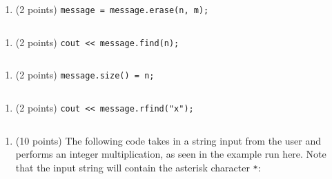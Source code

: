 \documentclass[
]{article}
\providecommand{\tightlist}{%
  \setlength{\itemsep}{0pt}\setlength{\parskip}{0pt}}
\begin{document}
\begin{verbatim}

\end{verbatim}

\begin{enumerate}
\def\labelenumi{\alph{enumi}.}
\setcounter{enumi}{1}
\tightlist
\item
  (2 points) \texttt{message\ =\ message.erase(n,\ m);}
\end{enumerate}

\begin{verbatim}

\end{verbatim}

\begin{enumerate}
\def\labelenumi{\alph{enumi}.}
\setcounter{enumi}{2}
\tightlist
\item
  (2 points) \texttt{cout\ \textless{}\textless{}\ message.find(n);}
\end{enumerate}

\begin{verbatim}

\end{verbatim}

\begin{enumerate}
\def\labelenumi{\alph{enumi}.}
\setcounter{enumi}{3}
\tightlist
\item
  (2 points) \texttt{message.size()\ =\ n;}
\end{enumerate}

\begin{verbatim}

\end{verbatim}

\begin{enumerate}
\def\labelenumi{\alph{enumi}.}
\setcounter{enumi}{4}
\tightlist
\item
  (2 points) \texttt{cout\ \textless{}\textless{}\ message.rfind("x");}
\end{enumerate}

\begin{verbatim}

\end{verbatim}

\begin{enumerate}
\def\labelenumi{\arabic{enumi}.}
\setcounter{enumi}{1}
\tightlist
\item
  (10 points) The following code takes in a string input from the user
  and performs an integer multiplication, as seen in the example run
  here. Note that the input string will contain the asterisk character
  \texttt{\textquotesingle{}*\textquotesingle{}}:
\end{enumerate}
\end{document}
